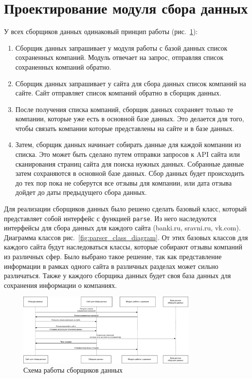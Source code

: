 \documentclass[PI, VKR]{HSEUniversity}
\begin{document}
\section{Проектирование модуля сбора данных}
\label{sec:org89f23ff}
У всех сборщиков данных одинаковый принцип работы (рис.~\ref{fig:parser_flow}):
\begin{enumerate}
\item Сборщик данных запрашивает у модуля работы с базой данных список сохраненных компаний. Модуль отвечает на запрос, отправляя список сохраненных компаний обратно.
\item Сборщик данных запрашивает у сайта для сбора данных список компаний на сайте. Сайт отправляет список компаний обратно в сборщик данных.
\item После получения списка компаний, сборщик данных сохраняет только те компании, которые уже есть в основной базе данных. Это делается для того, чтобы связать компании которые представлены на сайте и в базе данных.
\item Затем, сборщик данных начинает собирать данные для каждой компании из списка. Это может быть сделано путем отправки запросов к API сайта или сканирования страниц сайта для поиска нужных данных. Собранные данные затем сохраняются в основной базе данных. Сбор данных будет происходить до тех пор пока не соберутся все отзывы для компании, или дата отзыва дойдет до даты предыдущего сбора данных.
\end{enumerate}

Для реализации сборщиков данных было решено сделать базовый класс, который представляет собой интерфейс с функцией \texttt{parse}. Из него наследуются интерфейсы для сбора данных для каждого сайта (banki.ru, sravni.ru, vk.com). Диаграмма классов рис.~\ref{fig:parser_class_diagram}. От этих базовых классов для каждого сайта будут наследоваться классы, которые собирают отзывы компаний из различных сфер. Было выбрано такое решение, так как представление информации в рамках одного сайта в различных разделах может сильно различаться. Также у каждого сборщика данных будет своя база данных для сохранения информации о компаниях.

\begin{figure}[h!]
\centering
\includegraphics[width=0.8\textwidth]{img/mermaid/parser_flow_draw.png}
\caption{\label{fig:parser_flow}Схема работы сборщиков данных}
\end{figure}
\end{document}
